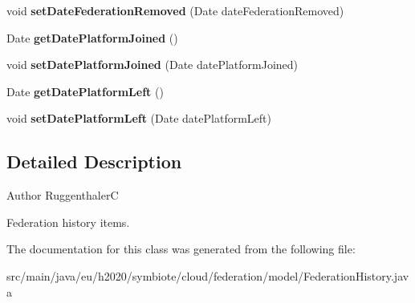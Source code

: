 \begin{DoxyCompactItemize}
void {\bfseries set\+Date\+Federation\+Removed} (Date date\+Federation\+Removed)
\item 
\mbox{\label{classeu_1_1h2020_1_1symbiote_1_1cloud_1_1federation_1_1model_1_1FederationHistory_a812252624b88475764d9afa8917faf87}} 
Date {\bfseries get\+Date\+Platform\+Joined} ()
\item 
\mbox{\label{classeu_1_1h2020_1_1symbiote_1_1cloud_1_1federation_1_1model_1_1FederationHistory_ab608da6d919459f259cce9b1c2e41947}} 
void {\bfseries set\+Date\+Platform\+Joined} (Date date\+Platform\+Joined)
\item 
\mbox{\label{classeu_1_1h2020_1_1symbiote_1_1cloud_1_1federation_1_1model_1_1FederationHistory_a7091d6366a26fa32bff08425e09bc1ed}} 
Date {\bfseries get\+Date\+Platform\+Left} ()
\item 
\mbox{\label{classeu_1_1h2020_1_1symbiote_1_1cloud_1_1federation_1_1model_1_1FederationHistory_a69bf61515bfef1b24f6d9c8b877df275}} 
void {\bfseries set\+Date\+Platform\+Left} (Date date\+Platform\+Left)
\end{DoxyCompactItemize}


\subsection{Detailed Description}
\begin{DoxyAuthor}{Author}
RuggenthalerC \begin{DoxyVerb}    Federation history items.\end{DoxyVerb}
 
\end{DoxyAuthor}


The documentation for this class was generated from the following file\+:\begin{DoxyCompactItemize}
\item 
src/main/java/eu/h2020/symbiote/cloud/federation/model/Federation\+History.\+java\end{DoxyCompactItemize}
